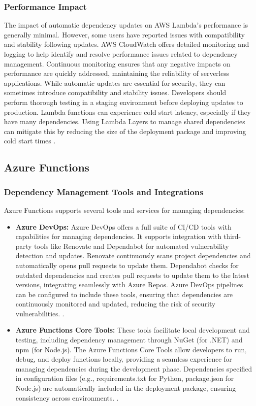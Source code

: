\documentclass[sigconf]{acmart}
\begin{document}
\subsubsection{Performance Impact}

The impact of automatic dependency updates on AWS Lambda's performance is generally minimal. However, some users have reported issues with compatibility and stability following updates. AWS CloudWatch offers detailed monitoring and logging to help identify and resolve performance issues related to dependency management. Continuous monitoring ensures that any negative impacts on performance are quickly addressed, maintaining the reliability of serverless applications. While automatic updates are essential for security, they can sometimes introduce compatibility and stability issues. Developers should perform thorough testing in a staging environment before deploying updates to production. Lambda functions can experience cold start latency, especially if they have many dependencies. Using Lambda Layers to manage shared dependencies can mitigate this by reducing the size of the deployment package and improving cold start times \cite{lambdaPerformance2023}.

\subsection{Azure Functions}

\subsubsection{Dependency Management Tools and Integrations}

Azure Functions supports several tools and services for managing dependencies:

\begin{itemize}
    \item \textbf{Azure DevOps:} Azure DevOps offers a full suite of CI/CD tools with capabilities for managing dependencies. It supports integration with third-party tools like Renovate and Dependabot for automated vulnerability detection and updates. Renovate continuously scans project dependencies and automatically opens pull requests to update them. Dependabot checks for outdated dependencies and creates pull requests to update them to the latest versions, integrating seamlessly with Azure Repos. Azure DevOps pipelines can be configured to include these tools, ensuring that dependencies are continuously monitored and updated, reducing the risk of security vulnerabilities. \cite{azureDevOps2023}.
    \item \textbf{Azure Functions Core Tools:} These tools facilitate local development and testing, including dependency management through NuGet (for .NET) and npm (for Node.js). The Azure Functions Core Tools allow developers to run, debug, and deploy functions locally, providing a seamless experience for managing dependencies during the development phase. Dependencies specified in configuration files (e.g., requirements.txt for Python, package.json for Node.js) are automatically included in the deployment package, ensuring consistency across environments. \cite{azureCoreTools2023}.
\end{itemize}
\end{document}

